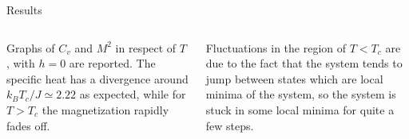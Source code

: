 \documentclass{beamer}
\begin{document}
\begin{frame}{Results}

\begin{columns}


Graphs of $C_v$ and $M^2$ in respect of $T$, with $h=0$ are reported. The specific
heat has a divergence around $k_B T_c / J \simeq 2.22$ as expected, while for 
$T > T_c$ the magnetization rapidly fades off.

\vspace{5mm}

Fluctuations in the region of $T < T_c$ are due to the fact that the system tends
to jump between states which are local minima of the system, so the system is
stuck in some local minima for quite a few steps. 



\end{columns}
\end{frame}
\end{document}
